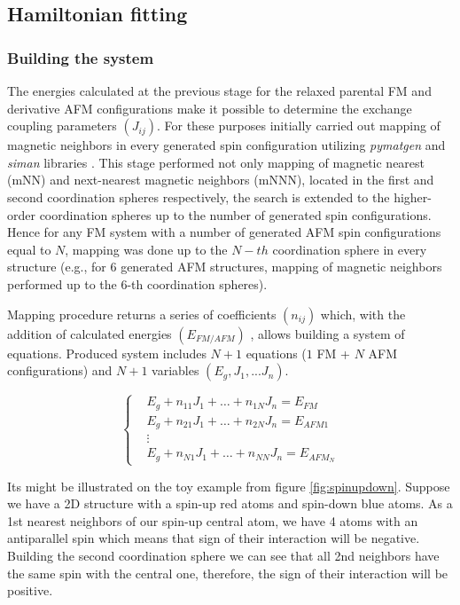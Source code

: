 \subsection{Hamiltonian fitting}

\subsubsection{Building the system}
The energies calculated at the previous stage for the relaxed parental FM and derivative AFM configurations make it possible to determine the exchange coupling parameters $(J_{ij})$. For these purposes initially carried out mapping of magnetic neighbors in every generated spin configuration utilizing \textit{pymatgen} \cite{Ong:2013vd} and \textit{siman} \cite{Aksyonov_2018} libraries . This stage performed not only mapping of magnetic nearest (mNN) and next-nearest magnetic neighbors (mNNN), located in the first and second coordination spheres respectively, the search is extended to the higher-order coordination spheres up to the number of generated spin configurations.
Hence for any FM system with a number of generated AFM spin configurations equal to $N$, mapping was done up to the $N-th$ coordination sphere in every structure (e.g., for 6 generated AFM structures, mapping of magnetic neighbors performed up to the 6-th coordination spheres).

Mapping procedure returns a series of coefficients $(n_{ij})$ which, with the addition of calculated energies $(E_{FM/AFM})$ , allows building a system of equations. Produced system includes $N + 1$ equations ($1$ FM + $N$ AFM configurations) and $N + 1$ variables $(E_g, J_1, ... J_n)$. 

\begin{equation}
  \left\{
    \begin{aligned}
      & E_g + n_{11}J_1 + \hdots + n_{1N} J_n = E_{FM}\\
      & E_g + n_{21}J_1 + \hdots + n_{2N} J_n = E_{AFM1}\\
      &\vdots\\
      & E_g + n_{N1} J_1 + \hdots + n_{NN}J_n = E_{AFM_N}
    \end{aligned}
  \right.
\end{equation}


Its might be illustrated on the toy example from figure \ref{fig:spinupdown}. Suppose we have a 2D structure with a spin-up red atoms and spin-down blue atoms.  As a 1st nearest neighbors of our spin-up central atom, we have 4 atoms with an antiparallel spin which means that sign of their interaction will be negative. Building the second coordination sphere we can see that all 2nd neighbors have the same spin with the central one, therefore, the sign of their interaction will be positive. 

